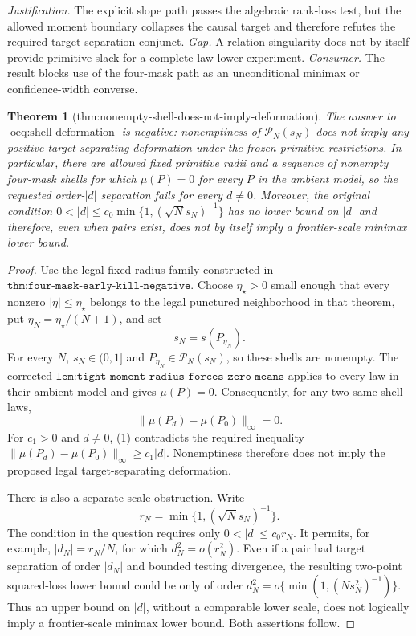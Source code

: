 \documentclass{article}
\newtheorem{theorem}{Theorem}
\begin{document}
\par\smallskip\noindent \textit{Justification.} The explicit slope path passes the algebraic rank-loss test, but the allowed moment boundary collapses the causal target and therefore refutes the required target-separation conjunct. \textit{Gap.} A relation singularity does not by itself provide primitive slack for a complete-law lower experiment. \textit{Consumer.} The result blocks use of the four-mask path as an unconditional minimax or confidence-width converse.

\begin{theorem}[thm:nonempty-shell-does-not-imply-deformation]\label{thm:nonempty-shell-does-not-imply-deformation}
The answer to \(\operatorname{oeq:shell-deformation}\) is negative: nonemptiness of \(\mathcal P_N(s_N)\) does not imply any positive target-separating deformation under the frozen primitive restrictions. In particular, there are allowed fixed primitive radii and a sequence of nonempty four-mask shells for which \(\mu(P)=0\) for every \(P\) in the ambient model, so the requested order-\(|d|\) separation fails for every \(d\ne0\). Moreover, the original condition \(0<|d|\leq c_0\min\{1,(\sqrt N s_N)^{-1}\}\) has no lower bound on \(|d|\) and therefore, even when pairs exist, does not by itself imply a frontier-scale minimax lower bound.
\end{theorem}
\begin{proof}
Use the legal fixed-radius family constructed in \(\texttt{thm:four-mask-early-kill-negative}\). Choose \(\eta_\star>0\) small enough that every nonzero \(|\eta|\leq\eta_\star\) belongs to the legal punctured neighborhood in that theorem, put \(\eta_N=\eta_\star/(N+1)\), and set
\[
s_N=s(P_{\eta_N}).
\]
For every \(N\), \(s_N\in(0,1]\) and \(P_{\eta_N}\in\mathcal P_N(s_N)\), so these shells are nonempty. The corrected \(\texttt{lem:tight-moment-radius-forces-zero-means}\) applies to every law in their ambient model and gives \(\mu(P)=0\). Consequently, for any two same-shell laws,
\[
\|\mu(P_d)-\mu(P_0)\|_\infty=0.
\tag{1}
\]
For \(c_1>0\) and \(d\neq0\), (1) contradicts the required inequality \(\|\mu(P_d)-\mu(P_0)\|_\infty\geq c_1|d|\). Nonemptiness therefore does not imply the proposed legal target-separating deformation.

There is also a separate scale obstruction. Write
\[
r_N=\min\{1,(\sqrt N s_N)^{-1}\}.
\]
The condition in the question requires only \(0<|d|\leq c_0r_N\). It permits, for example, \(|d_N|=r_N/N\), for which \(d_N^2=o(r_N^2)\). Even if a pair had target separation of order \(|d_N|\) and bounded testing divergence, the resulting two-point squared-loss lower bound could be only of order \(d_N^2=o\{\min(1,(Ns_N^2)^{-1})\}\). Thus an upper bound on \(|d|\), without a comparable lower scale, does not logically imply a frontier-scale minimax lower bound. Both assertions follow.
\end{proof}
\end{document}
